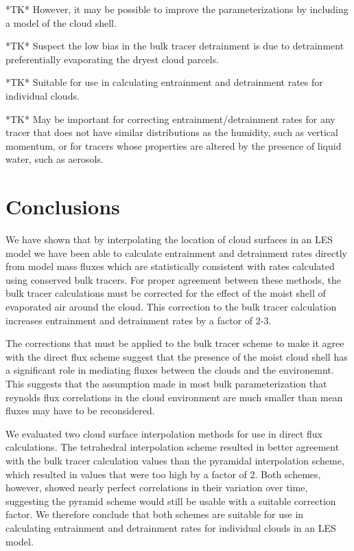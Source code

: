 \documentclass[12pt]{article}
\begin{document}
*TK* However, it may be possible to improve the parameterizations by including 
a model of the cloud shell.

*TK* Suspect the low bias in the bulk tracer detrainment is due to detrainment
preferentially evaporating the dryest cloud parcels.

*TK* Suitable for use in calculating entrainment and detrainment rates for 
individual clouds.

*TK* May be important for correcting entrainment/detrainment rates for any 
tracer that does not have similar distributions as the humidity, such as 
vertical momentum, or for tracers whose properties are altered by the presence 
of liquid water, such as aerosols.



\section{Conclusions}

We have shown that by interpolating the location of cloud surfaces in an LES
model we have been able to calculate entrainment and detrainment rates directly 
from model mass fluxes which are statistically consistent with rates calculated
using conserved bulk tracers.  For proper agreement between these methods, the
bulk tracer calculations must be corrected for the effect of the moist shell of
evaporated air around the cloud.  This correction to the bulk tracer calculation
increases entrainment and detrainment rates by a factor of 2-3.

The corrections that must be applied to the bulk tracer scheme to make it agree
with the direct flux scheme suggest that the presence of the moist cloud shell 
has a significant role in mediating fluxes between the clouds and the
environemnt.  This suggests that the assumption made in most bulk
parameterization that reynolds flux correlations in the cloud environment are
much smaller than mean fluxes may have to be reconsidered.

We evaluated two cloud surface interpolation methods for use in direct flux 
calculations.  The tetrahedral interpolation scheme resulted in better
agreement with the bulk tracer calculation values than the pyramidal
interpolation scheme, which resulted in values that were too high by a factor
 of 2.  Both schemes, however, showed nearly perfect correlations in their
variation over time, suggesting the pyramid scheme would still be usable with a
suitable correction factor.  We therefore conclude that both schemes are
suitable for use in calculating entrainment and detrainment rates for
individual clouds in an LES model.
\end{document}
